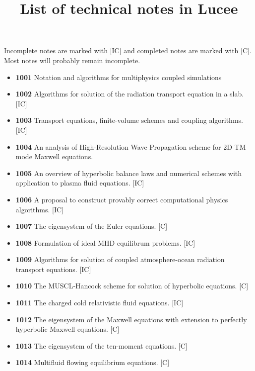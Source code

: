 \documentclass[11pt]{article}
\title{List of technical notes in Lucee}
\author{}
\date{}
\begin{document}
\maketitle

Incomplete notes are marked with [IC] and completed notes are marked
with [C]. Most notes will probably remain incomplete.

\begin{itemize}
\item {\bf 1001} Notation and algorithms for multiphysics coupled
  simulations
\item {\bf 1002} Algorithms for solution of the radiation transport
  equation in a slab. [IC]
\item {\bf 1003} Transport equations, finite-volume schemes and
  coupling algorithms. [IC]
\item {\bf 1004} An analysis of High-Resolution Wave Propagation
  scheme for 2D TM mode Maxwell equations.
\item {\bf 1005} An overview of hyperbolic balance laws and
  numerical schemes with application to plasma fluid equations. [IC]
\item {\bf 1006} A proposal to construct provably correct
  computational physics algorithms. [IC]
\item {\bf 1007} The eigensystem of the Euler equations. [C]
\item {\bf 1008} Formulation of ideal MHD equilibrum problems. [IC]
\item {\bf 1009} Algorithms for solution of coupled atmosphere-ocean
  radiation transport equations. [IC]
\item {\bf 1010} The MUSCL-Hancock scheme for solution of hyperbolic
  equations. [C]
\item {\bf 1011} The charged cold relativistic fluid equations. [IC]
\item {\bf 1012} The eigensystem of the Maxwell equations with
  extension to perfectly hyperbolic Maxwell equations. [C]
\item {\bf 1013} The eigensystem of the ten-moment equations. [C]
\item {\bf 1014} Multifluid flowing equilibrium equations. [C]
\end{itemize}
\end{document}

